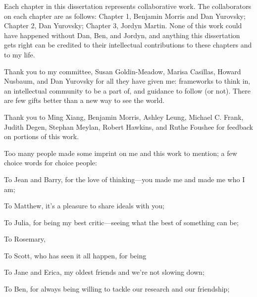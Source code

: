 \documentclass{ucetd}
\date{August 2023}
\title{\thesistitle}
\author{\thesisauthor}
\begin{document}
\maketitle



\newpage
{}
\tableofcontents
{}
\newpage
{}
\listoffigures
\newpage
{}
\listoftables
\newpage

\acknowledgments
Each chapter in this dissertation represents collaborative work. The collaborators on each chapter are as follows: Chapter 1, Benjamin Morris and Dan Yurovsky; Chapter 2, Dan Yurovsky; Chapter 3, Jordyn Martin. None of this work could have happened without Dan, Ben, and Jordyn, and anything this dissertation gets right can be credited to their intellectual contributions to these chapters and to my life.

Thank you to my committee, Susan Goldin-Meadow, Marisa Casillas, Howard Nusbaum, and Dan Yurovsky for all they have given me: frameworks to think in, an intellectual community to be a part of, and guidance to follow (or not). There are few gifts better than a new way to see the world.

Thank you to Ming Xiang, Benjamin Morris, Ashley Leung, Michael C. Frank, Judith Degen, Stephan Meylan, Robert Hawkins, and Ruthe Foushee for feedback on portions of this work. 

Too many people made some imprint on me and this work to mention; a few choice words for choice people:

To Jean and Barry, for the love of thinking—you made me and made me who I am;

To Matthew, it's a pleasure to share ideals with you;

To Julia, for being my best critic—seeing what the best of something can be;

To Rosemary, 

To Scott, who has seen it all happen, for being 

To Jane and Erica, my oldest friends and we're not slowing down;

To Ben, for always being willing to tackle our research and our friendship;
\end{document}
